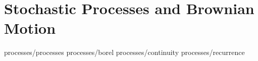\chapter	{Stochastic Processes and Brownian Motion}

	{processes/processes}
	{processes/borel}
	{processes/continuity}
	{processes/recurrence}
